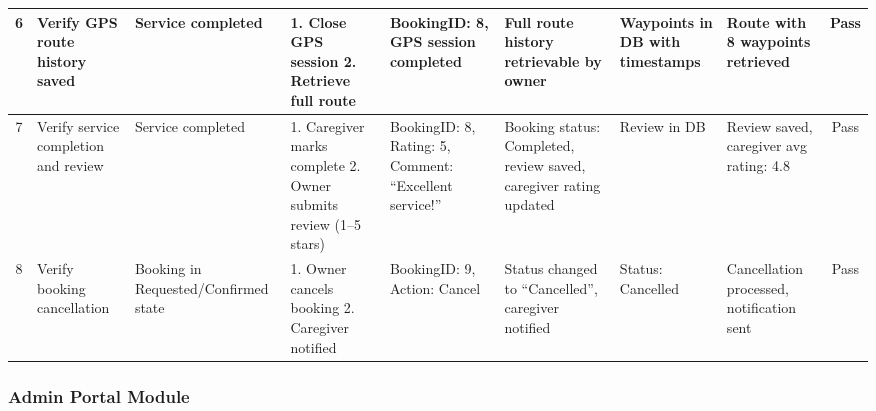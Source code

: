 \begin{table}[H]
{\begin{tabular}{|c|p{3cm}|p{2.5cm}|p{3.5cm}|p{3cm}|p{3cm}|p{2.5cm}|p{2.5cm}|c|}
6 & Verify GPS route history saved & Service completed & 1. Close GPS session 2. Retrieve full route & BookingID: 8, GPS session completed & Full route history retrievable by owner & Waypoints in DB with timestamps & Route with 8 waypoints retrieved & Pass \\ \hline
7 & Verify service completion and review & Service completed & 1. Caregiver marks complete 2. Owner submits review (1--5 stars) & BookingID: 8, Rating: 5, Comment: ``Excellent service!'' & Booking status: Completed, review saved, caregiver rating updated & Review in DB & Review saved, caregiver avg rating: 4.8 & Pass \\ \hline
8 & Verify booking cancellation & Booking in Requested/Confirmed state & 1. Owner cancels booking 2. Caregiver notified & BookingID: 9, Action: Cancel & Status changed to ``Cancelled'', caregiver notified & Status: Cancelled & Cancellation processed, notification sent & Pass \\ \hline
\end{tabular}%
}
\label{tab:ut_caregiver}
\end{table}

\subsubsection{Admin Portal Module}


